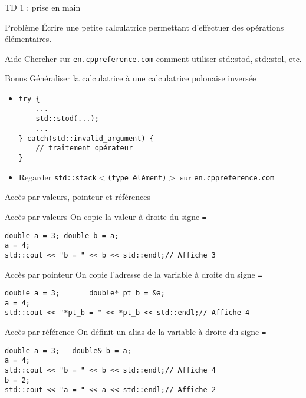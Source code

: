 \documentclass[handout,10pt]{beamer}
\begin{document}

\begin{frame}[fragile]{TD 1 : prise en main}
\tiny
\begin{block}{Problème}
Écrire une petite calculatrice permettant d'effectuer des opérations élémentaires.
\end{block}

\begin{block}{Aide}
Chercher sur \texttt{en.cppreference.com} comment utiliser std::stod, std::stol, etc.
\end{block}

\begin{block}{Bonus}
Généraliser la calculatrice à une calculatrice polonaise inversée
\begin{itemize}
\item \begin{lstlisting}
try { 
    ...
    std::stod(...); 
    ...
} catch(std::invalid_argument) { 
    // traitement opérateur
}
\end{lstlisting}
\item Regarder \texttt{std::stack$<$(type élément)$>$} sur \texttt{en.cppreference.com}
\end{itemize}
\end{block}
\end{frame}

\begin{frame}[fragile]{Accès par valeurs, pointeur et références}
\tiny
\begin{block}{Accès par valeurs}
On copie la valeur à droite du signe \texttt{=} 
\begin{lstlisting}
double a = 3; double b = a;
a = 4;
std::cout << "b = " << b << std::endl;// Affiche 3
\end{lstlisting}
\end{block}

\begin{block}{Accès par pointeur}
On copie l'adresse de la variable à droite du signe \texttt{=} 
\begin{lstlisting}
double a = 3;       double* pt_b = &a;
a = 4;
std::cout << "*pt_b = " << *pt_b << std::endl;// Affiche 4
\end{lstlisting}
\end{block}

\begin{block}{Accès par référence}
On définit un alias de la variable à droite du signe \texttt{=}
\begin{lstlisting}
double a = 3;   double& b = a;
a = 4;
std::cout << "b = " << b << std::endl;// Affiche 4
b = 2;
std::cout << "a = " << a << std::endl;// Affiche 2
\end{lstlisting}
\end{block}

\end{frame}
\end{document}
